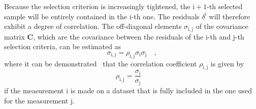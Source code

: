 Because the selection criterion is increasingly tightened, the $\mathrm{i+1}$-th selected sample will be entirely contained in the $\mathrm{i}$-th one. The residuals $\delta^\mathrm{i}$ will therefore exhibit a degree of correlation. The off-diagonal elements $\sigma_\mathrm{i,j}$ of the covariance matrix $\mathbf{C}$, which are the covariance between the residuals of the i-th and j-th selection criteria, can be estimated as 
\begin{equation*}
    \sigma_\mathrm{i,j} = \rho_\mathrm{i,j}\sigma_\mathrm{i}\sigma_\mathrm{j}\quad ,
\end{equation*}
where it can be demonstrated~\cite{cowan1998statistical} that the correlation coefficient $\rho_\mathrm{i,j}$ is given by 
\begin{equation*}
    \rho_\mathrm{i,j} = \frac{\sigma_\mathrm{i}}{\sigma_\mathrm{j}}\quad 
\end{equation*}
if the measurement i is made on a dataset that is fully included in the one used for the measurement j. 

